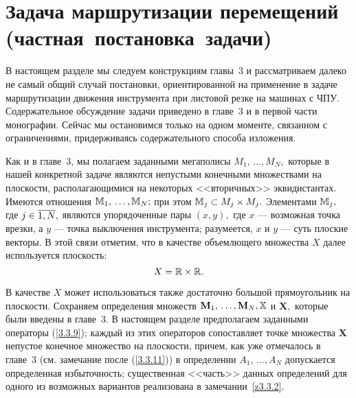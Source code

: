 
\section{
  Задача маршрутизации перемещений
  (частная~постановка~задачи)
}
\label{sect:5.2}
\setcounter{equation}{0}

В настоящем разделе мы следуем конструкциям главы~3
и рассматриваем далеко не самый общий случай постановки,
ориентированной на применение в задаче маршрутизации
движения инструмента при листовой резке на машинах с ЧПУ.
Содержательное обсуждение задачи приведено в главе~3
и в первой части монографии.
Сейчас мы остановимся только на одном моменте,
связанном с ограничениями,
придерживаясь содержательного способа изложения.


Как и в главе~3,
мы полагаем заданными мегаполисы
$M_1,\,\ldots,M_N,$
которые в нашей конкретной задаче являются непустыми конечными множествами на плоскости,
располагающимися на некоторых <<вторичных>> эквидистантах.
Имеются отношения
$\bbm_1,\,\ldots,\bbm_N;$
при этом ${\mathbb M}_j\subset M_j\times M_j.$
Элементами
${\mathbb M}_j,$ где $j\in \ov{1,N},$
являются упорядоченные пары $(x,y),$
где $x$ --- возможная точка врезки,
а $y$ --- точка выключения инструмента;
разумеется, $x$
и $y$ --- суть плоские векторы.
В этой связи отметим, что в качестве объемлющего
множества $X$ далее используется плоскость:
$$
  X = {\mathbb R}\times {\mathbb R}
  .
$$

В качестве $X$
может использоваться также достаточно большой прямоугольник на плоскости.
Сохраняем определения множеств
$\mathbf{M}_1,\,\ldots,\mathbf{M}_N, \bbx$
и $\mathbf{X},$
которые были введены в главе~3.
В настоящем разделе предполагаем заданными операторы (\ref{3.3.9});
каждый из этих операторов сопоставляет точке множества $\mathbf{X}$
непустое конечное множество на плоскости,
причем, как уже отмечалось в главе~3
(см. замечание после (\ref{3.3.11}))
в определении $A_1,\,\ldots,A_N$
допускается определенная избыточность;
существенная <<часть>> данных определений
для одного из возможных вариантов реализована в замечании~\ref{z3.3.2}.

